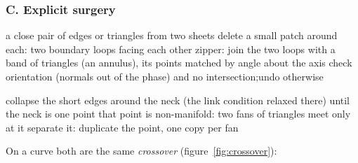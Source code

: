 \documentclass[10pt,a4paper]{article}
\theoremstyle{definition}
\begin{document}
\subsubsection{C. Explicit surgery}

\begin{algorithm}[H]
  \caption{\textsc{Merge}: two facing sheets \cite{brochu}}
  \label{alg:merge}
  \begin{algorithmic}[1]
    \Require a close pair of edges or triangles from two sheets
    \State delete a small patch around each: two boundary loops facing
      each other
    \State zipper: join the two loops with a band of triangles (an
      annulus), its points matched by angle about the axis
    \State check orientation (normals out of the phase) and no
      intersection;\quad undo otherwise
  \end{algorithmic}
\end{algorithm}

\begin{algorithm}[H]
  \caption{\textsc{Breakup}: a thinning neck \cite{brochu}}
  \label{alg:breakup}
  \begin{algorithmic}[1]
    \State collapse the short edges around the neck (the link condition
      relaxed there) until the neck is one point
    \State that point is non-manifold: two fans of triangles meet only at
      it
    \State separate it: duplicate the point, one copy per fan 
  \end{algorithmic}
\end{algorithm}

On a curve both are the same \emph{crossover} (figure~\ref{fig:crossover}):
\end{document}
